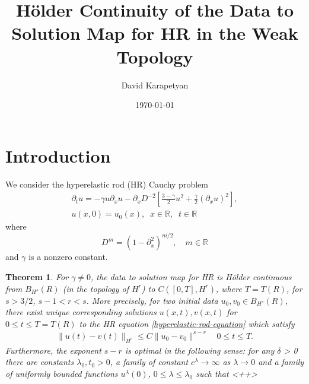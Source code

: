 \documentclass[12pt,reqno]{amsart}
\numberwithin{equation}{section}  %
\numberwithin{figure}{section}
\newcommand{\rr}{\mathbb{R}}
\newcommand{\p}{\partial}
\newtheorem{theorem}{Theorem}[section]
\begin{document}
\title[H\"older Continuity of the Data to Solution Map for HR]{H\"older Continuity of the Data to Solution Map for HR in the
Weak Topology}
\author{David Karapetyan}
\address{Department of Mathematics  \\
    University  of Notre Dame\\
        Notre Dame, IN 46556 }
        \date{\today}
        \maketitle
        \section{Introduction}
%
%
%
We consider the hyperelastic rod (HR) Cauchy problem
\begin{gather}
 \p_t u =  -\gamma u \p_x u -
 \p_{x} D^{-2} \left[ \frac{3-\gamma}{2}u^2 +
\frac{\gamma}{2} \left( \p_x u \right)^2
\right],
\label{hyperelastic-rod-equation}
\\
 u(x,0) = u_0(x), \; \; x \in \rr, \; \; t \in \rr
\label{init-cond}
\end{gather}
%
%
where 
\begin{equation*}
	D^{m} = (1 - \p_x^2)^{m/2}, \quad m \in \rr
\end{equation*}
and  $\gamma$  is a  nonzero constant. 
%
%
\begin{theorem}
For $\gamma \neq 0$, the data to solution map for HR is H\"older continuous from
$B_{H^{s}}(R)$ (in the topology of $H^{r}$) to $C([0, T], H^{r})$, where $T =
T(R)$, for $s > 3/2$, $s-1 < r < s$. More precisely, for two initial data
$u_{0}, v_{0} \in B_{H^{s}}(R)$, there exist unique corresponding solutions
$u(x,t), v(x,t)$ for $0 \le t \le T= T(R)$ to the HR equation
\eqref{hyperelastic-rod-equation} which satisfy 
%
%
\begin{equation*}
\begin{split}
  \| u(t) - v(t) \|_{H^{r}} \le C \| u_{0} - v_{0} \|^{s-r}
  \quad 0
  \le t \le T.
\end{split}
\end{equation*}
%
Furthermore, the exponent $s-r$ is optimal in the following sense: for any
$\delta$ > 0 there are constants $\lambda_{0}, t_{0} > 0$, a family of constant
$c^{\lambda} \to \infty$ as $\lambda \to 0$ and a family of uniformly bounded
functions $u^{\lambda}(0)$, $0 \le \lambda \le \lambda_{0}$ such that
%
%
%
%
<++>
\end{theorem}
%
%
\end{document}
